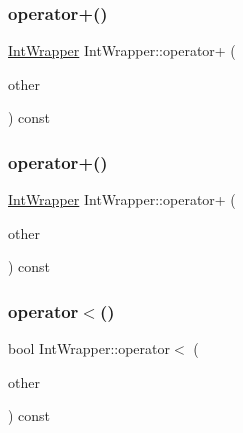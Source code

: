 \mbox{\label{class_int_wrapper_abf97bd11dd2825f3cb9e4d9f48152b56}} 
\subsubsection{\texorpdfstring{operator+()}{operator+()}\hspace{0.1cm}{\footnotesize\ttfamily [2/3]}}
{\footnotesize\ttfamily \mbox{\hyperlink{class_int_wrapper}{Int\+Wrapper}} Int\+Wrapper\+::operator+ (\begin{DoxyParamCaption}\item[{int}]{other }\end{DoxyParamCaption}) const\hspace{0.3cm}{\ttfamily [inline]}}

\mbox{\label{class_int_wrapper_abf97bd11dd2825f3cb9e4d9f48152b56}} 
\subsubsection{\texorpdfstring{operator+()}{operator+()}\hspace{0.1cm}{\footnotesize\ttfamily [3/3]}}
{\footnotesize\ttfamily \mbox{\hyperlink{class_int_wrapper}{Int\+Wrapper}} Int\+Wrapper\+::operator+ (\begin{DoxyParamCaption}\item[{int}]{other }\end{DoxyParamCaption}) const\hspace{0.3cm}{\ttfamily [inline]}}

\mbox{\label{class_int_wrapper_a940fd2978cdf7849281f11b32df94163}} 
\subsubsection{\texorpdfstring{operator$<$()}{operator<()}\hspace{0.1cm}{\footnotesize\ttfamily [1/3]}}
{\footnotesize\ttfamily bool Int\+Wrapper\+::operator$<$ (\begin{DoxyParamCaption}\item[{const \mbox{\hyperlink{class_int_wrapper}{Int\+Wrapper}} \&}]{other }\end{DoxyParamCaption}) const\hspace{0.3cm}{\ttfamily [inline]}}

